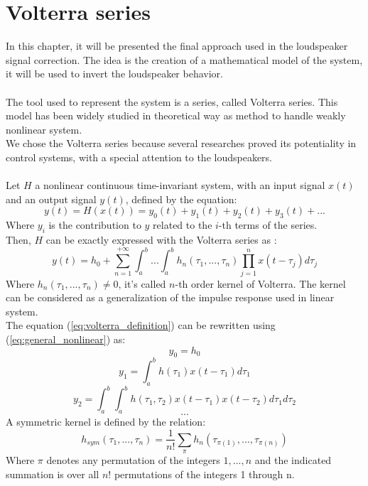 \section{Volterra series}
In this chapter, it will be presented the final approach used in the loudspeaker signal correction. The idea is the creation of a mathematical model of the system, it will be used to invert the loudspeaker behavior.\\\\
The tool used to represent the system is a series, called Volterra series. This model has been widely studied in theoretical way as method to handle weakly nonlinear system.\\
We chose the Volterra series because several researches proved its potentiality in control systems, with a special attention to the loudspeakers.\\\\
Let $H$ a nonlinear continuous time-invariant system, with an input signal $x(t)$ and an output signal $y(t)$, defined by the equation:
\begin{equation}
y(t) = H(x(t)) = y_0(t) + y_1(t) + y_2(t) + y_3(t) +...
\label{eq:general_nonlinear}
\end{equation}
Where $y_i$ is the contribution to $y$ related to the $i$-th terms of the series.\\
Then, $H$ can be exactly expressed with the Volterra series as \cite{volterra} :
\begin{equation}
y(t) = h_0 + \sum_{n=1}^{+\infty} \int_a^b ... \int_a^b \! h_n(\tau_1, ..., \tau_n) \prod_{j=1}^n x(t-\tau_j) d\tau_j
\label{eq:volterra_definition}
\end{equation}
Where $h_n(\tau_1, ..., \tau_n)\neq 0$, it's called $n$-th order kernel of Volterra. The kernel can be considered as a generalization of the impulse response used in linear system.\\
The equation (\ref{eq:volterra_definition}) can be rewritten using (\ref{eq:general_nonlinear}) as:
\[ y_0 = h_0 \]
\[ y_1 = \int_a^b h(\tau_1) x(t-\tau_1 )d\tau_1 \]
\[ y_2 = \int_a^b \int_a^b  h(\tau_1, \tau_2) x(t-\tau_1 ) x(t-\tau_2 )d\tau_1 d\tau_2 \]
\[ ...\]
A symmetric kernel is defined by the relation:
\begin{equation}
h_{sym}(\tau_1, ..., \tau_n) = \frac{1}{n!} \sum_{\pi} h_n(\tau_{\pi (1)}, ..., \tau_{\pi (n)} )
\label{eq:symmetric_kernel}
\end{equation} 
Where  $\pi $ denotes any permutation of the integers $1, . . . ,n$ and the indicated summation is over all $n !$ permutations of the integers 1 through n.\\

